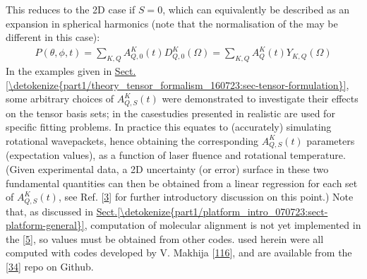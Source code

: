 \documentclass[letterpaper,table,10pt,english]{jupyterBook}
\begin{document}
\sphinxAtStartPar
This reduces to the 2D case if \(S=0\), which can equivalently be described as an expansion in spherical harmonics (note that the normalisation of the {\hyperref[\detokenize{backmatter/glossary:term-ADMs}]{}} may be different in this case):
\begin{equation}\label{equation:part1/theory_molecular_alignment_170723:eqn:P-omega-t-2D}
\begin{split} 
P(\theta,\phi,t) = \sum_{K,Q} A^K_{Q,0}(t)D^K_{Q,0}(\Omega) = \sum_{K,Q} A^K_{Q}(t)Y_{K,Q}(\Omega)
\end{split}
\end{equation}
\sphinxAtStartPar
In the examples given in \hyperref[\detokenize{part1/theory_tensor_formalism_160723:sec-tensor-formulation}]{Sect.\@ \ref{\detokenize{part1/theory_tensor_formalism_160723:sec-tensor-formulation}}}, some arbitrary choices of \(A^K_{Q,S}(t)\) were demonstrated to investigate their effects on the tensor basis sets; in the case\sphinxhyphen{}studies presented in {\hyperref[\detokenize{part2/extracting_matrix_elements_overview_270423:chpt-extracting-matrix-elements-overview}]{}} realistic {\hyperref[\detokenize{backmatter/glossary:term-ADMs}]{}} are used for specific fitting problems. In practice this equates to (accurately) simulating rotational wavepackets, hence obtaining the corresponding \(A_{Q,S}^{K}(t)\) parameters (expectation values), as a function of laser fluence and rotational temperature. (Given experimental data, a 2D uncertainty (or error) surface in these two fundamental quantities can then be obtained from a linear regression for each set of \(A_{Q,S}^{K}(t)\), see Ref. {[}\hyperlink{cite.backmatter/bibliography:id686}{3}{]} for further introductory discussion on this point.) Note that, as discussed in \hyperref[\detokenize{part1/platform_intro_070723:sect-platform-general}]{Sect.\@ \ref{\detokenize{part1/platform_intro_070723:sect-platform-general}}}, computation of molecular alignment is not yet implemented in the  {[}\hyperlink{cite.backmatter/bibliography:id682}{5}{]}, so values must be obtained from other codes. {\hyperref[\detokenize{backmatter/glossary:term-ADMs}]{}} used herein were all computed with codes developed by V. Makhija {[}\hyperlink{cite.backmatter/bibliography:id772}{116}{]}, and are available from the  {[}\hyperlink{cite.backmatter/bibliography:id608}{34}{]} repo on Github.
\end{document}
